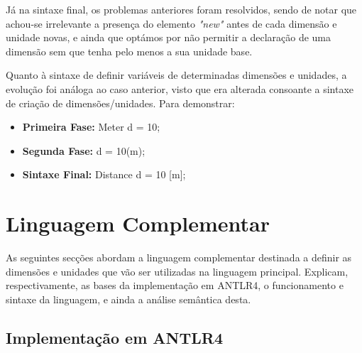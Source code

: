 \documentclass[10pt,portuguese]{article}
\begin{document}
\par Já na sintaxe final, os problemas anteriores foram resolvidos, sendo de notar que achou-se irrelevante a presença do elemento \emph{"new"} antes de cada dimensão e unidade novas, e ainda que optámos por não permitir a declaração de uma dimensão sem que tenha pelo menos a sua unidade base.
\newline
\newline
\par Quanto à sintaxe de definir variáveis de determinadas dimensões e unidades, a evolução foi análoga ao caso anterior, visto que era alterada consoante a sintaxe de criação de dimensões/unidades. Para demonstrar:
\begin{itemize}
    \item \textbf{Primeira Fase:} Meter d = 10;
    \item \textbf{Segunda Fase:} d = 10(m);
    \item \textbf{Sintaxe Final:} Distance d = 10 [m];
\end{itemize}

\newpage
\section{Linguagem Complementar}

\par As seguintes secções abordam a linguagem complementar destinada a definir as dimensões e unidades que vão ser utilizadas na linguagem principal. Explicam, respectivamente, as bases da implementação em ANTLR4, o funcionamento e sintaxe da linguagem, e ainda a análise semântica desta.

\subsection{Implementação em ANTLR4}
\end{document}
